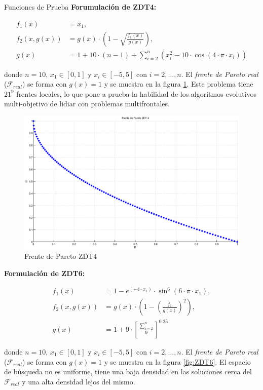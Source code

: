\begin{chapter}{Funciones de Prueba}
\textbf{Forumulaci\'on de ZDT4:}

\begin{align*}
f_1(x)&=x_1,\\
f_2(x,g(x))&=g(x)\cdot \left(1-\sqrt{ \frac{f_1(x)}{g(x)}}\right),\\
g(x)&=1+10\cdot(n-1)+ \sum_{i=2}^n(x_i^2-10\cdot \cos(4\cdot\pi\cdot x_i))
\end{align*}

donde $n=10$, $x_1\in[0,1]$ y $x_i \in[-5,5] $ con $i=2, \ldots, n$. El \textit{frente de Pareto real} ($\mathcal{F}_{real}$) se forma con $g(x)=1$ 
y se muestra en la figura \ref{fig:ZDT4}. Este problema tiene  $21^9$ frentes locales, lo que pone a prueba la habilidad de los algoritmos
evolutivos multi-objetivo de lidiar con problemas multifrontales.

\begin{figure}[h!]
 \centering
\includegraphics[scale=0.45]{ApendiceA/paretoZDT4.eps}
\caption{Frente de Pareto ZDT4}
\label{fig:ZDT4}
\end{figure} 

\textbf{Formulaci\'on de ZDT6:}

\begin{align*}
f_1(x)&=1- e^{(-4\cdot x_1)} \cdot \sin^6(6\cdot\pi\cdot x_1),\\
f_2(x,g(x))&=g(x)\cdot(1-\left(\frac{f_1}{g(x)}\right)^2),\\
g(x)&=1+9\cdot\left[\frac{\sum_{i=2}^n}{9}\right]^{0.25}
\end{align*}

donde $n=10$, $x_1\in[0,1]$ y $x_i \in[-5,5]$ con $i= 2, \ldots, n$. El \textit{frente de Pareto real} ($\mathcal{F}_{real}$) se forma con $g(x)=1$
y se muestra en la figura \ref{fig:ZDT6}. El espacio de b\'usqueda no es uniforme, tiene una baja densidad en las soluciones cerca del 
$\mathcal{F}_{real}$ y una alta densidad lejos del mismo.


\end{chapter}
